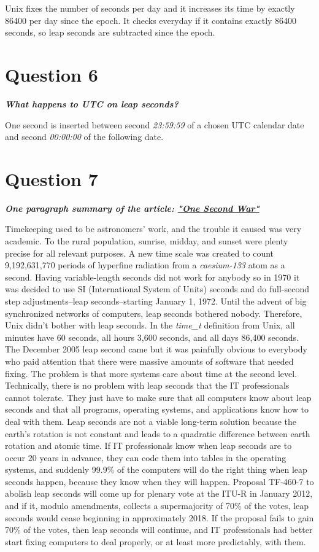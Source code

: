 \documentclass[12pt,letterpaper]{article}
\begin{document}
Unix fixes the number of seconds per day and it increases its time by exactly 86400 per day since the epoch. It checks everyday if it contains exactly 86400 seconds, so leap seconds are subtracted since the epoch.

\section*{Question 6}
\textbf{\textit{What happens to UTC on leap seconds?}} 

One second is inserted between second \textit{23:59:59} of a chosen UTC calendar date and second \textit{00:00:00} of the following date. 

\section*{Question 7}
\textbf{\textit{One paragraph summary of the article: \href{https://cacm.acm.org/magazines/2011/5/107699-the-one-second-war/fulltext}{"One Second War"}}} 

Timekeeping used to be astronomers' work, and the trouble it caused was very academic. To the rural population, sunrise, midday, and sunset were plenty precise for all relevant purposes. A new time scale was created to count 9,192,631,770 periods of hyperfine radiation from a \textit{caesium-133} atom as a second. Having variable-length seconds did not work for anybody so in 1970 it was decided to use SI (International System of Units) seconds and do full-second step adjustments--leap seconds--starting January 1, 1972. Until the advent of big synchronized networks of computers, leap seconds bothered nobody. Therefore, Unix didn't bother with leap seconds. In the \textit{time\_t} definition from Unix, all minutes have 60 seconds, all hours 3,600 seconds, and all days 86,400 seconds. The December 2005 leap second came but it was painfully obvious to everybody who paid attention that there were massive amounts of software that needed fixing. The problem is that more systems care about time at the second level. Technically, there is no problem with leap seconds that the IT professionals cannot tolerate. They just have to make sure that all computers know about leap seconds and that all programs, operating systems, and applications know how to deal with them. Leap seconds are not a viable long-term solution because the earth's rotation is not constant and leads to a quadratic difference between earth rotation and atomic time. If IT professionals know when leap seconds are to occur 20 years in advance, they can code them into tables in the operating systems, and suddenly 99.9\% of the computers will do the right thing when leap seconds happen, because they know when they will happen. Proposal TF-460-7 to abolish leap seconds will come up for plenary vote at the ITU-R in January 2012, and if it, modulo amendments, collects a supermajority of 70\% of the votes, leap seconds would cease beginning in approximately 2018. If the proposal fails to gain 70\% of the votes, then leap seconds will continue, and IT professionals had better start fixing computers to deal properly, or at least more predictably, with them.
\end{document}
